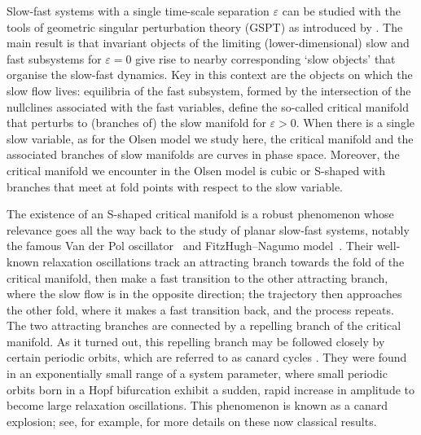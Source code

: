 \documentclass{ws-ijbc}
\begin{document}
Slow-fast systems with a single time-scale separation $\varepsilon$ can be studied with the tools of geometric singular perturbation theory (GSPT) \cite{Jones} as introduced by \cite{Fenichel}. The main result is that invariant objects of the limiting (lower-dimensional) slow and fast subsystems for $\varepsilon = 0$ give rise to nearby corresponding `slow objects' that organise the slow-fast dynamics. Key in this context are the objects on which the slow flow lives: equilibria of the fast subsystem, formed by the intersection of the nullclines associated with the fast variables, define the so-called critical manifold that perturbs to (branches of) the slow manifold for $\varepsilon > 0$. When there is a single slow variable, as for the Olsen model we study here, the critical manifold and the associated branches of slow manifolds are curves in phase space. Moreover, the critical manifold we encounter in the Olsen model is cubic or S-shaped with branches that meet at fold points with respect to the slow variable. 

The existence of an S-shaped critical manifold is a robust phenomenon whose relevance goes all the way back to the study of planar slow-fast systems, notably the famous Van der Pol oscillator~\cite{vdpol} and FitzHugh--Nagumo  model~\cite{FH,Nagumo}. Their well-known relaxation oscillations track an attracting branch towards the fold of the critical manifold, then make a fast transition to the other attracting branch, where the slow flow is in the opposite direction; the trajectory then approaches the other fold, where it makes a fast transition back, and the process repeats. The two attracting branches are connected by a repelling branch of the critical manifold. As it turned out, this repelling branch may be followed closely by certain periodic orbits, which are referred to as canard cycles \cite{canard_explosion}. They were found in an exponentially small range of a system parameter, where small periodic orbits born in a Hopf bifurcation exhibit a sudden, rapid increase in amplitude to become large relaxation oscillations. This phenomenon is known as a canard explosion; see, for example, \cite{MMO, GH} for more details on these now classical results.
\end{document}
